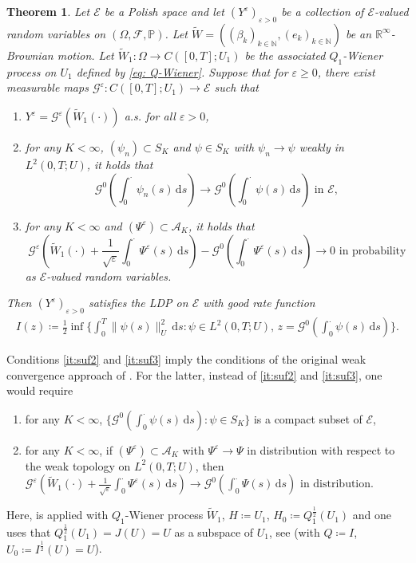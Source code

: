 \documentclass{amsart}
\newcommand{\dd}{\,\mathrm{d}}
\newcommand{\<}{\langle}
\newcommand{\?}{\rangle}
\theoremstyle{plain}
\newtheorem{theorem}{Theorem}[section]
\theoremstyle{remark}
\theoremstyle{plain}
\numberwithin{equation}{section}
\def\N{{\mathbb N}}
\def\R{{\mathbb R}}
\newcommand{\F}{\mathcal{F}}
\newcommand{\G}{\mathcal{G}}
\renewcommand{\P}{\mathbb{P}}
\newcommand{\Om}{\Omega}
\newcommand{\eps}{\varepsilon}
\begin{document}
\begin{theorem}\label{th: sufficient LDP criterion}
Let $\mathcal{E}$ be a Polish space and let $(Y^\eps)_{\eps>0}$ be a collection of $\mathcal{E}$-valued random variables on $(\Omega,\F,\P)$.
Let $\tilde{W}=((\beta_k)_{k\in\N},(e_k)_{k\in\N})$ be an $\R^\infty$-Brownian motion. Let $\tilde{W}_1\colon \Om\to C([0,T];U_1)$ be the associated $Q_1$-Wiener process on $U_1$ defined by \eqref{eq: Q-Wiener}.
Suppose that for $\eps\geq 0$, there exist measurable maps $\G^\eps\colon C([0,T];U_1)\to\mathcal{E}$ such that
\begin{enumerate}[label=\emph{(\roman*)},ref=\textup{(\roman*)}]
\item \label{it:suf1} $Y^\eps=\G^\eps(\tilde{W}_1(\cdot))$ a.s. \!for all $\eps>0$,
  \item \label{it:suf2} for any $K<\infty$,  $(\psi_n)\subset S_K$ and $\psi\in S_K$ with $\psi_n\to \psi$ weakly in $L^2(0,T;U)$, it holds that
  \[
  \G^0\left(\int_0^{\cdot} \psi_n(s)\dd s\right)\to\G^0\left(\int_0^\cdot \psi(s)\dd s\right) \text{ in } \mathcal{E},
  \]
  \item \label{it:suf3} for any $K<\infty$ and $(\Psi^\eps)\subset \mathcal{A}_K$, it holds that
  \[
  \G^\eps\left(\tilde{W}_1(\cdot)+\frac{1}{\sqrt{\eps}}\int_0^{\cdot} \Psi^\eps(s)\dd s\right)-\G^0\left(\int_0^\cdot \Psi^\eps(s)\dd s\right)\to 0 \text{ in probability}
  \]
  as $\mathcal{E}$-valued random variables.
\end{enumerate}
Then $(Y^\eps)_{\eps>0}$ satisfies the LDP on $\mathcal{E}$ with good rate function
\begin{align}\label{eq: def rate I budhi}
I(z)\coloneqq \frac{1}{2}\inf\Big\{\int_0^T\|\psi(s)\|_U^2\dd s : \psi\in L^2(0,T;U),\, z=\G^0(\int_0^{\cdot} \psi(s)\dd s)\Big\}.
\end{align}
\end{theorem}
Conditions \ref{it:suf2} and \ref{it:suf3} imply the conditions of the original weak convergence approach of \cite{budhidupuis01}. For the latter, instead of  \ref{it:suf2} and \ref{it:suf3}, one would require
\begin{enumerate}[label={(\Roman*)},ref=\textup{(\Roman*)}, start=2]
    \item\label{it:bd1}  for any $K<\infty$, $\{\G^0(\int_0^\cdot \psi(s)\dd s):\psi\in S_K\}$ is a compact subset of $\mathcal{E}$,
  \item \label{it:bd2} for any $K<\infty$, if $(\Psi^\eps)\subset \mathcal{A}_K$ with $\Psi^\eps\to \Psi$ in distribution with respect to the weak topology on $L^2(0,T;U)$, then
  $\G^\eps\left(\tilde{W}_1(\cdot)+\frac{1}{\sqrt{\eps}}\int_0^{\cdot} \Psi^\eps(s)\dd s\right)\to  \G^0\left(\int_0^\cdot \Psi(s)\dd s\right) \text{ in distribution}$.
\end{enumerate}
Here, \cite[Th. 4.4]{budhidupuis01} is applied with $Q_1$-Wiener process  $\tilde{W}_1$,
$H\coloneqq U_1$, $H_0\coloneqq Q_1^{\frac{1}{2}}(U_1)$ and one uses that $Q_1^{\frac{1}{2}}(U_1)=J(U)=U$ as a subspace of $U_1$, see \cite[Prop. 2.5.2]{liurockner15} (with $Q\coloneqq I$, $U_0\coloneqq I^{\frac{1}{2}}(U)=U$).
\end{document}
